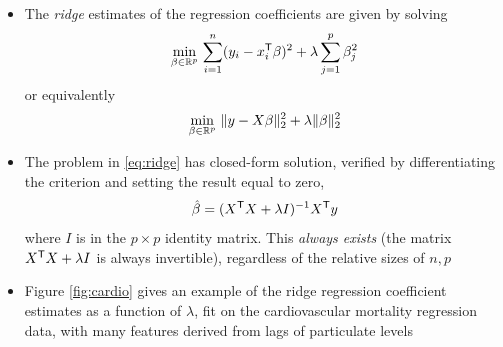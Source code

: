 \documentclass{article}
\begin{document}
\begin{itemize}
\item The \emph{ridge} estimates of the regression coefficients are given by
  solving     
  \[
  \min_{\beta \in \mathbb{R}^p} \, \sum_{i=1}^n (y_i - x_i^{\mathsf{T}} \beta)^2 + \lambda
  \sum_{j=1}^p \beta_j^2
  \]
  or equivalently
  \begin{equation}
  \label{eq:ridge}
  \min_{\beta \in \mathbb{R}^p} \, \|y - X \beta\|_2^2 + \lambda \|\beta\|_2^2
  \end{equation}

\item The problem in \eqref{eq:ridge} has closed-form solution, verified by  
  differentiating the criterion and setting the result equal to zero,
  \begin{equation}
  \label{eq:coef_ridge}
  \hat{\beta} = (X^{\mathsf{T}} X + \lambda I)^{-1} X^{\mathsf{T}} y
  \end{equation}
  where $I$ is in the $p \times p$ identity matrix. This \emph{always exists}
  (the matrix $X^{\mathsf{T}} X + \lambda I$ is always invertible), regardless of the
  relative sizes of $n,p$

\item Figure \ref{fig:cardio} gives an example of the ridge regression
  coefficient estimates as a function of $\lambda$, fit on the cardiovascular 
  mortality regression data, with many features derived from lags of particulate 
  levels 


\end{itemize}
\end{document}
